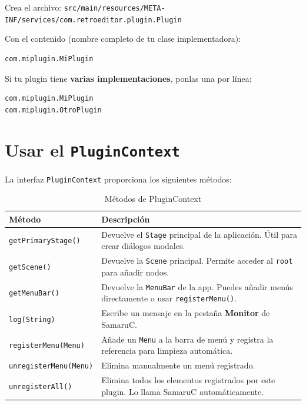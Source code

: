 \documentclass[../../main.tex]{subfiles}
\begin{document}
Crea el archivo:
\lstinline|src/main/resources/META-INF/services/com.retroeditor.plugin.Plugin|

Con el contenido (nombre completo de tu clase implementadora):

\begin{lstlisting}
com.miplugin.MiPlugin
\end{lstlisting}

Si tu plugin tiene \textbf{varias implementaciones}, ponlas una por línea:

\begin{lstlisting}
com.miplugin.MiPlugin
com.miplugin.OtroPlugin
\end{lstlisting}

\clearpage

\section{Usar el \lstinline|PluginContext|}

La interfaz \lstinline|PluginContext| proporciona los siguientes métodos:

\begin{table}[ht]
    \centering
    \small
    \begin{tabular}{p{4cm}p{8cm}}
    \toprule
    \textbf{Método} & \textbf{Descripción} \\
    \midrule
    \lstinline|getPrimaryStage()| & Devuelve el \lstinline|Stage| principal de la aplicación. Útil para crear diálogos modales. \\
    \lstinline|getScene()| & Devuelve la \lstinline|Scene| principal. Permite acceder al \lstinline|root| para añadir nodos. \\
    \lstinline|getMenuBar()| & Devuelve la \lstinline|MenuBar| de la app. Puedes añadir menús directamente o usar \lstinline|registerMenu()|. \\
    \lstinline|log(String)| & Escribe un mensaje en la pestaña \textbf{Monitor} de SamaruC. \\
    \lstinline|registerMenu(Menu)| & Añade un \lstinline|Menu| a la barra de menú y registra la referencia para limpieza automática. \\
    \lstinline|unregisterMenu(Menu)| & Elimina manualmente un menú registrado. \\
    \lstinline|unregisterAll()| & Elimina todos los elementos registrados por este plugin. Lo llama SamaruC automáticamente. \\
    \bottomrule
    \end{tabular}
    \caption{Métodos de PluginContext}
    \label{tab:metodos_plugin_context}
\end{table}
\end{document}
